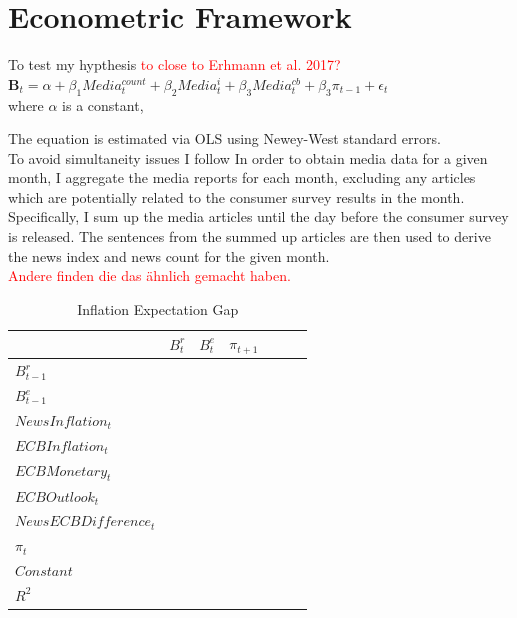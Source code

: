 \documentclass[review]{elsarticle}
\begin{document}

\section{Econometric Framework}\label{sec:Econometric Framework}
To test my hypthesis 
\textcolor{red}{to close to Erhmann et al. 2017?}
\\
$\mathbf{B}_t = \alpha + \beta_1 Media^{count}_t + \beta_2 Media^i_t + \beta_3 Media^{cb}_t +\beta_3 \pi_{t-1} + \epsilon_t$ \\
where $\alpha$ is a constant, 


The equation is estimated via OLS using Newey-West standard errors.
\\
To avoid simultaneity issues I follow \cite{LamlaLein2014} In order to obtain media data for a given month, I aggregate the media reports for each month, excluding any articles which are potentially related to the consumer survey results in the month. Specifically, I sum up the media articles until the day before the consumer survey is released. The sentences from the summed up articles are then used to derive the news index and news count for the given month.
\\
\textcolor{red}{Andere finden die das ähnlich gemacht haben.}
\\


\begin{table}[!h]
\centering 
  \caption{Inflation Expectation Gap} 
  \label{tab:Inflation Expectation Gap}
\begin{tabular}{l*{6}{c}}   
\toprule
 & $B^r_t$ & $B^e_t$ & $\pi_{t+1}$ & & & \\ 
\midrule
$B^r_{t-1}$ & & & & & & \\
$B^e_{t-1}$ & & & & & & \\
$NewsInflation_t$ & & & & & & \\
$ECBInflation_t$ & & & & & & \\
$ECBMonetary_t$ & & & & & & \\
$ECBOutlook_t$ & & & & & & \\
$News ECB Difference_t$ & & & & & & \\
$\pi_t$ & & & & & & \\
$Constant$ & & & & & & \\
\midrule
$R^2$ & & & & & & \\
\bottomrule
 \end{tabular} 
\end{table}
\end{document}
